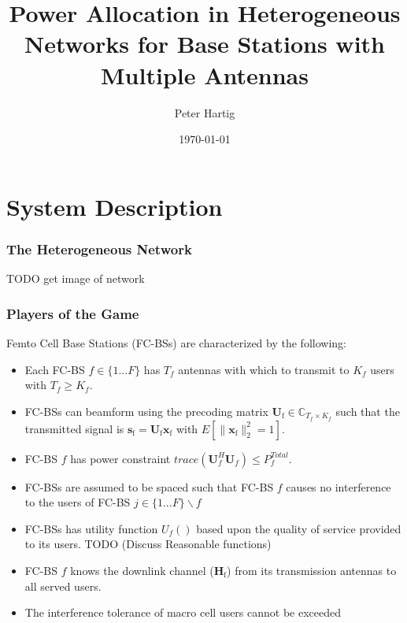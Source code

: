 \documentclass[10pt,tgadventor, onlymath]{beamer}
\title{\large \bfseries Power Allocation in Heterogeneous Networks for Base Stations with Multiple Antennas}
\author{Peter Hartig\\[3ex]
}
\date{\today}
\begin{document}
\frame{
\thispagestyle{empty}
\titlepage
}

\section{System Description}
\begin{frame}
\frametitle{The Heterogeneous Network}
TODO get image of network
\end{frame}

\begin{frame}
\frametitle{Players of the Game}
Femto Cell Base Stations (FC-BSs) are characterized by the following:
\begin{itemize}
\item 
	Each FC-BS  $f \in \{1 ... F\}$ has $T_f$ antennas with which to transmit to $K_f$  users with  $T_f \geq K_f$.
\\
\item 
	FC-BSs  can beamform using the precoding 	
	matrix $\mathbf{U}_{\mathrm{f}} \in \mathbb{C}_{T_f \times K_f}$ such that the transmitted 		
	signal is $\mathbf{s}_{\mathrm{f}
	}= \mathbf{U_{\mathrm{f}}}\mathbf{x_{\mathrm{f}}}$ with $E[\|\mathbf{x}_{\mathrm{f}}\|_2^2 = 1]$.
\\
\item 
	FC-BS $f$ has power constraint $trace(\mathbf{U}_f^H\mathbf{U}_f) \leq P^{Total}_{f} $.
\\
\item
	 FC-BSs are assumed to be spaced such that FC-BS $f$ causes no interference to the users of FC-BS $j \in \{1 ... F\}\backslash f$
\item 
	FC-BSs has utility function $U_f()$ based upon the quality of service 		
	provided to its users. TODO (Discuss Reasonable functions)
\\
\item 
	FC-BS $f$ knows the downlink channel ($\mathbf{H_\mathrm{f}}$) from its transmission antennas to all served users.
\\
\item
	The interference tolerance of macro cell users cannot be exceeded 
\end{itemize}

\end{frame}
\end{document}
